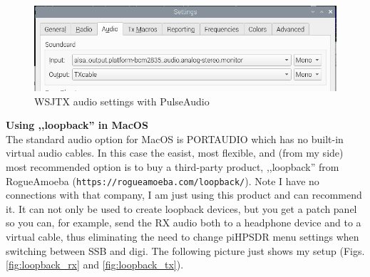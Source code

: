 \documentclass[12pt]{book}
\begin{document}
\begin{figure}[ht]
\center
\includegraphics[width=12cm]{wsjtx_settings_pa_audio.png}
\caption{WSJTX audio settings with PulseAudio}
\label{fig:wstx_settings_pa_audio}
\end{figure}



\begin{center}
\end{center}

\clearpage

\textbf{\color{red}Using ,,loopback'' in MacOS}\\
The standard audio option for MacOS is PORTAUDIO which has no built-in virtual
audio cables. In this case
the easist, most flexible, and (from my side) most recommended option is
to buy a third-party product,  ,,loopback'' from RogueAmoeba
(\texttt{https://rogueamoeba.com/loopback/}).
Note I have no connections with that company, I am just using this product and
can recommend it. It can not only be used to create loopback devices, but you get
a patch panel so you can, for example, send the RX audio both to a headphone device
and to a virtual cable, thus eliminating the need to change piHPSDR menu settings
when switching between SSB and digi. The following picture just shows my setup
(Figs. \ref{fig:loopback_rx} and \ref{fig:loopback_tx}).
\end{document}
